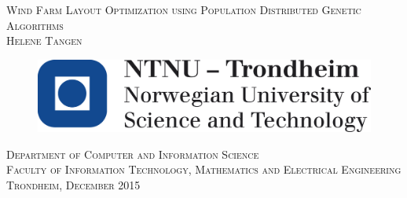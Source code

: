 \begin{titlepage}
 \vspace*{\fill}
    \begin{center}
    {\Huge \scshape \Large Wind Farm Layout Optimization using Population Distributed Genetic Algorithms}\\[0.5cm]
      {      \scshape Helene Tangen }
     \end{center}
	\vspace*{3cm}
    \begin{figure}[h!]
    \centering
    \includegraphics[scale=0.3]{logo_ntnu_eng}
    \end{figure}
    \begin{center}
    \scshape Department of Computer and Information Science \\
    \scshape Faculty of Information Technology, Mathematics and Electrical Engineering\\
  	\normalfont Trondheim, December 2015
    \end{center}
   \vspace*{\fill}

\end{titlepage}
